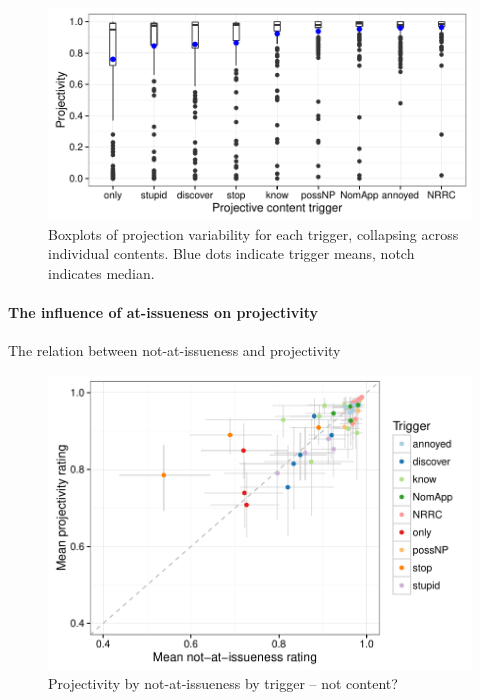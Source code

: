 \documentclass[11pt,fleqn]{article}
\newcommand{\6}{\mbox{$[\hspace*{-.6mm}[$}}
\newcommand{\9}{\mbox{$]\hspace*{-.6mm}]$}}
\begin{document}
\begin{figure}[!h]

\begin{center}
\includegraphics[width=12cm]{../results/exp1a/graphs/boxplot-projection}

\end{center}

\caption{Boxplots of projection variability for each trigger, collapsing across individual contents. Blue dots indicate trigger means, notch indicates median.}\label{f-proj-1a}
\end{figure}

\paragraph{The influence of at-issueness on projectivity}

The relation between not-at-issueness and projectivity

\begin{figure}[!h]

\begin{center}
\includegraphics[width=12cm]{../results/exp1a/graphs/ai-proj-bytrigger-nofacets}

\end{center}

\caption{Projectivity by not-at-issueness by trigger -- not content?}\label{f-proj-ai-1a}
\end{figure}
\end{document}

